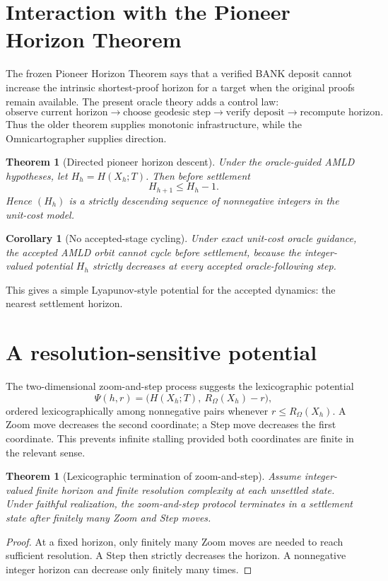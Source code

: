 \documentclass[11pt]{article}
\newtheorem{theorem}[definition]{Theorem}
\newtheorem{corollary}[definition]{Corollary}
\theoremstyle{remark}
\newcommand{\Omni}{\Omega}
\begin{document}
\section{Interaction with the Pioneer Horizon Theorem}

The frozen Pioneer Horizon Theorem says that a verified BANK deposit cannot increase the intrinsic shortest-proof horizon for a target when the original proofs remain available. The present oracle theory adds a control law:
\[
\text{observe current horizon}\to
\text{choose geodesic step}\to
\text{verify deposit}\to
\text{recompute horizon}.
\]
Thus the older theorem supplies monotonic infrastructure, while the Omnicartographer supplies direction.

\begin{theorem}[Directed pioneer horizon descent]
Under the oracle-guided AMLD hypotheses, let $H_h=H(X_h;T)$. Then before settlement
\[
H_{h+1}\le H_h-1.
\]
Hence $(H_h)$ is a strictly descending sequence of nonnegative integers in the unit-cost model.
\end{theorem}

\begin{corollary}[No accepted-stage cycling]
Under exact unit-cost oracle guidance, the accepted AMLD orbit cannot cycle before settlement, because the integer-valued potential $H_h$ strictly decreases at every accepted oracle-following step.
\end{corollary}

This gives a simple Lyapunov-style potential for the accepted dynamics: the nearest settlement horizon.

\section{A resolution-sensitive potential}

The two-dimensional zoom-and-step process suggests the lexicographic potential
\[
\Psi(h,r)=\bigl(H(X_h;T),\ R_{\Omni}(X_h)-r\bigr),
\]
ordered lexicographically among nonnegative pairs whenever $r\le R_{\Omni}(X_h)$. A Zoom move decreases the second coordinate; a Step move decreases the first coordinate. This prevents infinite stalling provided both coordinates are finite in the relevant sense.

\begin{theorem}[Lexicographic termination of zoom-and-step]
Assume integer-valued finite horizon and finite resolution complexity at each unsettled state. Under faithful realization, the zoom-and-step protocol terminates in a settlement state after finitely many Zoom and Step moves.
\end{theorem}
\begin{proof}
At a fixed horizon, only finitely many Zoom moves are needed to reach sufficient resolution. A Step then strictly decreases the horizon. A nonnegative integer horizon can decrease only finitely many times.
\end{proof}
\end{document}
